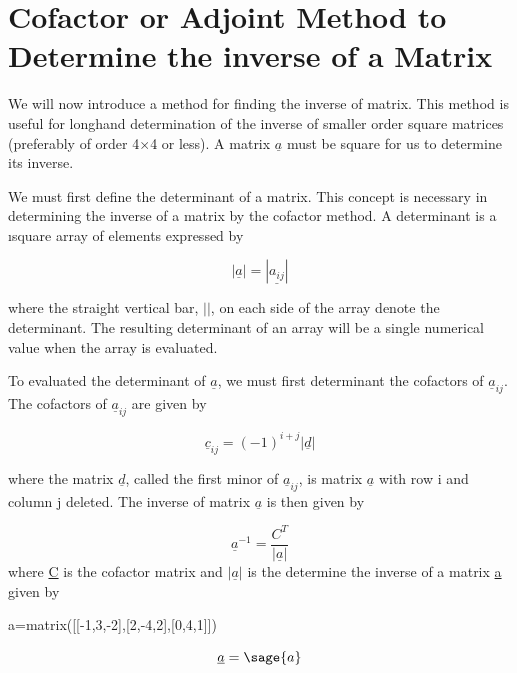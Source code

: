 \documentclass[12pt]{report}
\begin{document}
\section[Cofactor or Adjoint Method]{Cofactor or Adjoint Method to Determine the inverse of a Matrix}

We will now introduce a method for finding the inverse of matrix. This
method is useful for longhand determination of the inverse of smaller
order square matrices (preferably of order 4$\times$4 or less). A
matrix $\underline{a}$ must be square for us to determine its inverse.


We must first define the determinant of a matrix. This concept is
necessary in determining the inverse of a matrix by the cofactor
method. A determinant is a \i{square array of elements expressed by}

\begin{equation}
	|\underline {a}| = |\underline{a_{ij}}|
\end{equation}

where the straight vertical bar, $| |$, on each side of the array denote
the determinant. The resulting determinant of an array will be a
single numerical value when the array is evaluated.

To evaluated the determinant of
$\underline{a}$, we must first determinant the
cofactors of $\underline{a}_{ij}$.
The cofactors of $\underline{a}_{ij}$ are given by

\begin{equation}
	\underline{c}_{ij}=(-1)^{i+j} |\underline{d}|
\end{equation}

where the matrix $\underline{d}$, called the first minor of
 $\underline{a}_{ij}$, is matrix $\underline{a}$ with row 
i and column j deleted. The inverse of matrix
$\underline{a}$ is then given by

\begin{equation}
	\underline{a}^{-1}=\frac{C^{T}}{|\underline{a}|}
	\label{eq:cofinverse}
\end{equation}
where \underline{C} is the cofactor matrix and $|\underline{a}|$ is the determine the inverse of a matrix \underline{a} given by 
\begin{sagesilent}
	a=matrix([[-1,3,-2],[2,-4,2],[0,4,1]])
\end{sagesilent}

\begin{equation}
	\underline{a} = \sage{a} 
\end{equation}
\end{document}
